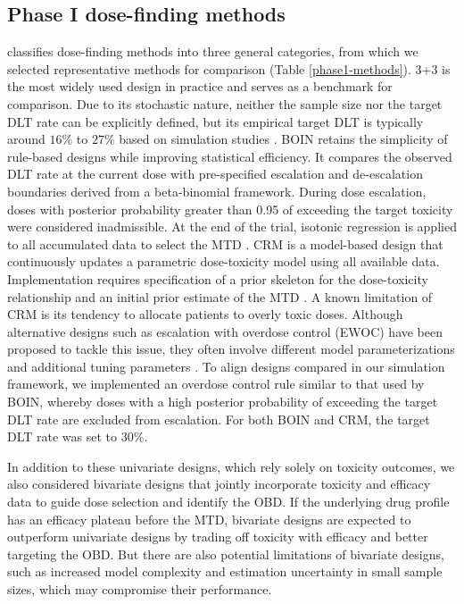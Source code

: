 \documentclass[11pt]{article}
\begin{document}
\subsection{Phase I dose-finding methods}
\textcite{clertant2022early} classifies dose-finding methods into three general categories, from which we selected representative methods for comparison (Table \ref{phase1-methods}). 3+3 is the most widely used design in practice and serves as a benchmark for comparison. Due to its stochastic nature, neither the sample size nor the target DLT rate can be explicitly defined, but its empirical target DLT is typically around $16\%$ to $27\%$ based on simulation studies \parencite{chiuzan_3_2024}. BOIN retains the simplicity of rule-based designs while improving statistical efficiency. It compares the observed DLT rate at the current dose with pre-specified escalation and de-escalation boundaries derived from a beta-binomial framework. During dose escalation, doses with posterior probability greater than 0.95 of exceeding the target toxicity were considered inadmissible. At the end of the trial, isotonic regression is applied to all accumulated data to select the MTD \parencite{BOIN}. CRM is a model-based design that continuously updates a parametric dose-toxicity model using all available data. Implementation requires specification of a prior skeleton for the dose-toxicity relationship and an initial prior estimate of the MTD \parencite{CRM}. A known limitation of CRM is its tendency to allocate patients to overly toxic doses. Although alternative designs such as escalation with overdose control (EWOC) have been proposed to tackle this issue, they often involve different model parameterizations and additional tuning parameters \parencite{EWOC}. To align designs compared in our simulation framework, we implemented an overdose control rule similar to that used by BOIN, whereby doses with a high posterior probability of exceeding the target DLT rate are excluded from escalation. For both BOIN and CRM, the target DLT rate was set to $30\%$.

In addition to these univariate designs, which rely solely on toxicity outcomes, we also considered bivariate designs that jointly incorporate toxicity and efficacy data to guide dose selection and identify the OBD. If the underlying drug profile has an efficacy plateau before the MTD, bivariate designs are expected to outperform univariate designs by trading off toxicity with efficacy and better targeting the OBD. But there are also potential limitations of bivariate designs, such as increased model complexity and estimation uncertainty in small sample sizes, which may compromise their performance.
\end{document}
